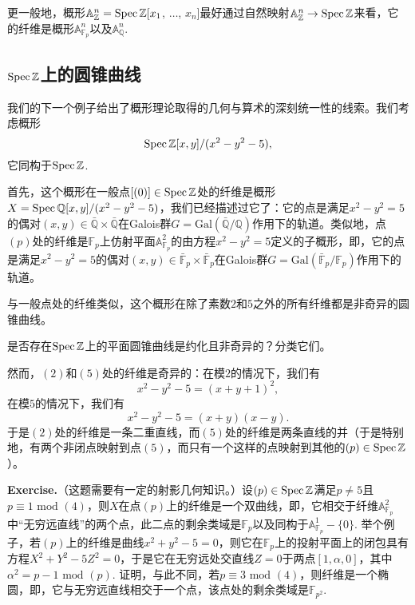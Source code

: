 更一般地，概形$\mathbb{A}_{\mathbb{Z}}^n=\operatorname{Spec} \mathbb{Z}[x_1$, $\dots$, $x_n]$最好通过自然映射$\mathbb{A}_{\mathbb{Z}}^n\to\operatorname{Spec} \mathbb{Z}$来看，它的纤维是概形$\mathbb{A}_{\mathbb{F}_p}^n$以及$\mathbb{A}_{\mathbb{Q}}^n$.

\subsection{$\operatorname{Spec} \mathbb{Z}$上的圆锥曲线}\label{sec:2.4.4}

我们的下一个例子给出了概形理论取得的几何与算术的深刻统一性的线索。我们考虑概形
\[
	\operatorname{Spec} \mathbb{Z}[x,y]/(x^2-y^2-5),
\]
它同构于$\operatorname{Spec} \mathbb{Z}$.

首先，这个概形在一般点$[(0)]\in \operatorname{Spec} \mathbb{Z}$处的纤维是概形$X=\operatorname{Spec} \mathbb{Q}[x,y]/(x^2-y^2-5)$，我们已经描述过它了：它的点是满足$x^2-y^2=5$的偶对$(x,y)\in \bar{\mathbb{Q}}\times \bar{\mathbb{Q}}$在Galois群$G=\mathrm{Gal}(\bar{\mathbb{Q}}/\mathbb{Q})$作用下的轨道。类似地，点$(p)$处的纤维是$\mathbb{F}_p$上仿射平面$\mathbb{A}_{\mathbb{F}_p}^2$的由方程$x^2-y^2=5$定义的子概形，即，它的点是满足$x^2-y^2=5$的偶对$(x,y)\in \bar{\mathbb{F}}_p\times \bar{\mathbb{F}}_p$在Galois群$G=\mathrm{Gal}(\bar{\mathbb{F}}_p/\mathbb{F}_p)$作用下的轨道。

与一般点处的纤维类似，这个概形在除了素数$2$和$5$之外的所有纤维都是非奇异的圆锥曲线。

\begin{exe}
	是否存在$\operatorname{Spec} \mathbb{Z}$上的平面圆锥曲线是约化且非奇异的？分类它们。
\end{exe}

然而，$(2)$和$(5)$处的纤维是奇异的：在模$2$的情况下，我们有
\[
	x^2-y^2-5=(x+y+1)^2,
\]
在模$5$的情况下，我们有
\[
	x^2-y^2-5=(x+y)(x-y).
\]
于是$(2)$处的纤维是一条二重直线，而$(5)$处的纤维是两条直线的并（于是特别地，有两个非闭点映射到点$(5)$，而只有一个这样的点映射到其他的$(p)\in \operatorname{Spec} \mathbb{Z}$）。


\noindent\textbf{Exercise\hspace{0.38em}{\addtocounter{thm}{1}}\thethm.}（这题需要有一定的射影几何知识。）设$(p)\in\operatorname{Spec}\mathbb{Z}$满足$p\neq 5$且$p\equiv 1\text{ mod } (4)$，则$X$在点$(p)$上的纤维是一个双曲线，即，它相交于纤维$\mathbb{A}_{\mathbb{F}_p}^2$中“无穷远直线”的两个点，此二点的剩余类域是$\mathbb{F}_p$以及同构于$\mathbb{A}_{\mathbb{F}_p}^1-\{0\}$. 举个例子，若$(p)$上的纤维是曲线$x^2+y^2-5=0$，则它在$\mathbb{F}_p$上的投射平面上的闭包具有方程$X^2+Y^2-5Z^2=0$，于是它在无穷远处交直线$Z=0$于两点$[1,\alpha,0]$，其中$\alpha^2=p-1\text{ mod } (p)$. 证明，与此不同，若$p\equiv 3\text{ mod } (4)$，则纤维是一个椭圆，即，它与无穷远直线相交于一个点，该点处的剩余类域是$\mathbb{F}_{p^2}$. \vspace{0.5em}

